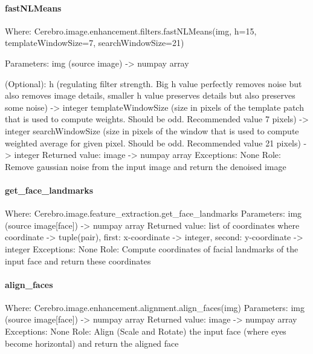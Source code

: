 \paragraph{fastNLMeans}
Where: Cerebro.image.enhancement.filters.fastNLMeans(img, h=15, templateWindowSize=7, searchWindowSize=21) \newline

Parameters: 
img (source image) -> numpay array \newline

(Optional): \newline
h (regulating filter strength. Big h value perfectly removes noise but also removes image details, smaller h value preserves details but also preserves some noise) -> integer \newline
templateWindowSize (size in pixels of the template patch that is used to compute weights. Should be odd. Recommended value 7 pixels) -> integer \newline
searchWindowSize (size in pixels of the window that is used to compute weighted average for given pixel. Should be odd. Recommended value 21 pixels) -> integer \newline
Returned value: image -> numpay array \newline
Exceptions: None \newline
Role: Remove gaussian noise from the input image and return the denoised image
\paragraph{get\_face\_landmarks}
Where: Cerebro.image.feature\_extraction.get\_face\_landmarks \newline
Parameters: img (source image[face]) -> numpay array \newline
Returned value: list of coordinates where coordinate -> tuple(pair), first: x-coordinate -> integer, second: y-coordinate -> integer \newline
Exceptions: None \newline
Role: Compute coordinates of facial landmarks of the input face and return these coordinates
\paragraph{align\_faces}
Where: Cerebro.image.enhancement.alignment.align\_faces(img) \newline
Parameters: img (source image[face]) -> numpay array \newline
Returned value: image -> numpay array \newline
Exceptions: None \newline
Role: Align (Scale and Rotate) the input face (where eyes become horizontal) and return the aligned face
